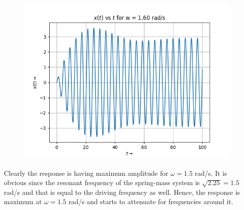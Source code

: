 \documentclass[12pt, a4paper]{article}
\begin{document}
\begin{figure}[H]
    \centering
    \includegraphics[scale = 0.9]{Figure_7.png}
    \label{fig:sample}
\end{figure}
Clearly the response is having maximum amplitude for $\omega = 1.5$ rad/s. It is obvious since the resonant frequency of the spring-mass system is $\sqrt{2.25} = 1.5$ rad/s 
and that is equal to the driving frequency as well. Hence, the response is maximum at $\omega = 1.5$ rad/s and starts to attenuate for frequencies around it.
\end{document}
